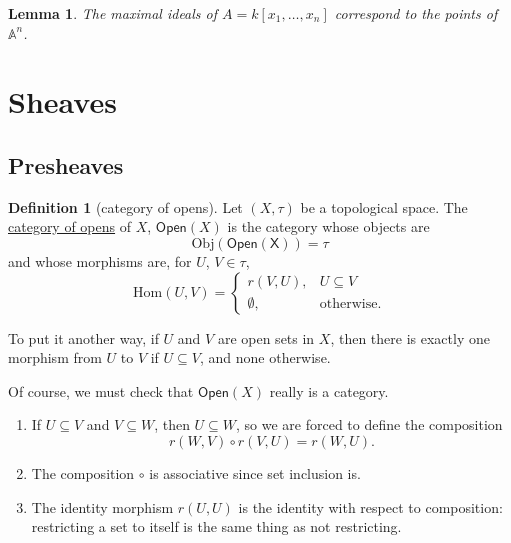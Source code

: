 \documentclass[a4paper]{report}
\newcommand{\defn}[1]{\ul{#1}}
\newcommand{\Obj}{\mathrm{Obj}}
\newcommand{\Hom}{\mathrm{Hom}}
\theoremstyle{definition}
\newtheorem{definition}{Definition}[section]
\theoremstyle{plain}
\newtheorem{lemma}{Lemma}[section]
\theoremstyle{remark}
\begin{document}
\begin{lemma}
  The maximal ideals of $A = k[x_{1}, \ldots, x_{n}]$ correspond to the points of $\mathbb{A}^{n}$.
\end{lemma}

\section{Sheaves}
\subsection{Presheaves}

\begin{definition}[category of opens] 
  \label{def:opencategory} 
  Let $(X, \tau)$ be a topological space. The \defn{category of opens} of $X$, $\mathsf{Open}(X)$ is the category whose objects are 
  \begin{equation*}
    \Obj(\mathsf{Open(X)}) = \tau 
  \end{equation*} and whose morphisms are, for $U$, $V \in \tau$, 
  \begin{equation*} 
    \Hom(U,V) =
    \begin{cases} 
      r(V,U), & U \subseteq V \\ 
      \emptyset, & \text{otherwise}.  
    \end{cases} 
  \end{equation*}

  To put it another way, if $U$ and $V$ are open sets in $X$, then there is exactly one morphism from $U$ to $V$ if $U \subseteq V$, and none otherwise.
\end{definition}

Of course, we must check that $\mathsf{Open}(X)$ really is a category.
\begin{enumerate} 
  \item If $U \subseteq V$ and $V \subseteq W$, then $U \subseteq W$, so we are forced to define the composition 
    \begin{equation*} 
      r(W,V) \circ r(V,U) = r(W,U).  
    \end{equation*} 
  \item The composition $\circ$ is associative since set inclusion is.

  \item The identity morphism $r(U,U)$ is the identity with respect to composition: restricting a set to itself is the same thing as not restricting.  
\end{enumerate}
\end{document}
